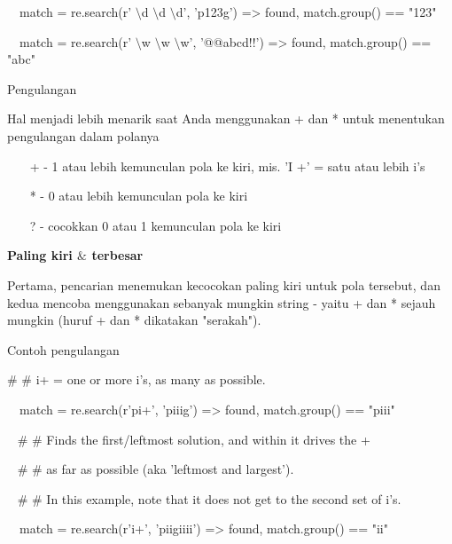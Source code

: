 \begin{12pt}
\begin{12pt}
\begin{12pt}
\begin{12pt}
\begin{12pt}
\begin{12pt}
\begin{12pt}
\noindent 
~~match = re.search(r' $  \setminus  $d $  \setminus  $d $  \setminus  $d', 'p123g') =>  found, match.group() == "123" \par
\noindent 
~~match = re.search(r' $  \setminus  $w $  \setminus  $w $  \setminus  $w', '@@abcd!!') =>  found, match.group() == "abc" \par
\vspace{12pt}
\vspace{12pt}
\noindent 
Pengulangan \par
\vspace{12pt}
\noindent 
Hal menjadi lebih menarik saat Anda menggunakan + dan * untuk menentukan pengulangan dalam polanya \par
\vspace{12pt}
\noindent 
~~~ + - 1 atau lebih kemunculan pola ke kiri, mis. 'I +' = satu atau lebih i's \par
\noindent 
~~~ * - 0 atau lebih kemunculan pola ke kiri \par
\noindent 
~~~ ? - cocokkan 0 atau 1 kemunculan pola ke kiri \par
\vspace{12pt}
\vspace{14pt}
\noindent 
{\fontsize{14pt}{14pt}\selectfont \textbf{Paling kiri  $  \&  $ terbesar} \\} \par
Pertama, pencarian menemukan kecocokan paling kiri untuk pola tersebut, dan kedua mencoba menggunakan sebanyak mungkin string - yaitu + dan * sejauh mungkin (huruf + dan * dikatakan "serakah"). \par
\noindent 
Contoh pengulangan \par
\vspace{12pt}
\noindent 
 $  \#  $ $  \#  $ i+ = one or more i's, as many as possible. \par
\noindent 
~~match = re.search(r'pi+', 'piiig') =>  found, match.group() == "piii" \par
\vspace{12pt}
\noindent 
~  $  \#  $ $  \#  $ Finds the first/leftmost solution, and within it drives the + \par
\noindent 
~  $  \#  $ $  \#  $ as far as possible (aka 'leftmost and largest'). \par
\noindent 
~  $  \#  $ $  \#  $ In this example, note that it does not get to the second set of i's. \par
\noindent 
~~match = re.search(r'i+', 'piigiiii') =>  found, match.group() == "ii" \par

\end{12pt}
\end{12pt}
\end{12pt}
\end{12pt}
\end{12pt}
\end{12pt}
\end{12pt}
